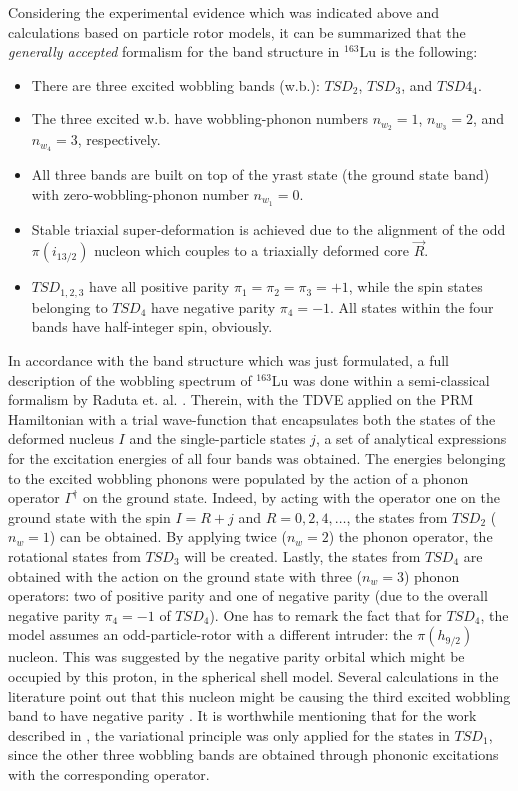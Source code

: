 \documentclass[11pt]{article}
\begin{document}
Considering the experimental evidence which was indicated above and calculations based on particle rotor models, it can be summarized that the \emph{generally accepted} formalism for the band structure in $^{163}$Lu is the following:
\begin{itemize}
    \item There are three excited wobbling bands (w.b.): $TSD_2$, $TSD_3$, and $TSD4_4$.
    \item The three excited w.b. have wobbling-phonon numbers $n_{w_2}=1$, $n_{w_3}=2$, and $n_{w_4}=3$, respectively.
    \item All three bands are built on top of the yrast state (the ground state band) with zero-wobbling-phonon number $n_{w_1}=0$.
    \item Stable triaxial super-deformation is achieved due to the alignment of the odd $\pi(i_{13/2})$ nucleon which couples to a triaxially deformed core $\vec{R}$.
    \item $TSD_{1,2,3}$ have all positive parity $\pi_1=\pi_2=\pi_3=+1$, while the spin states belonging to $TSD_4$ have negative parity $\pi_4=-1$. All states within the four bands have half-integer spin, obviously.
 \end{itemize}

In accordance with the band structure which was just formulated, a full description of the wobbling spectrum of $^{163}$Lu was done within a semi-classical formalism by Raduta et. al. \cite{raduta2017semiclassical}. Therein, with the TDVE applied on the PRM Hamiltonian with a trial wave-function that encapsulates both the states of the deformed nucleus $I$ and the single-particle states $j$, a set of analytical expressions for the excitation energies of all four bands was obtained. The energies belonging to the excited wobbling phonons were populated by the action of a phonon operator $\Gamma^\dagger$ on the ground state. Indeed, by acting with the operator one on the ground state with the spin $I=R+j$ and $R=0,2,4,\dots$, the states from $TSD_2$ ($n_w=1$) can be obtained. By applying twice ($n_w=2$) the phonon operator, the rotational states from $TSD_3$ will be created. Lastly, the states from $TSD_4$ are obtained with the action on the ground state with three ($n_w=3$) phonon operators: two of positive parity and one of negative parity (due to the overall negative parity $\pi_4=-1$ of $TSD_4$). One has to remark the fact that for $TSD_4$, the model assumes an odd-particle-rotor with a different intruder: the $\pi(h_{9/2})$ nucleon. This was suggested by the negative parity orbital which might be occupied by this proton, in the spherical shell model. Several calculations in the literature point out that this nucleon might be causing the third excited wobbling band to have negative parity \cite{jensen2004coexisting}. It is worthwhile mentioning that for the work described in \cite{raduta2017semiclassical}, the variational principle was only applied for the states in $TSD_1$, since the other three wobbling bands are obtained through phononic excitations with the corresponding operator.
\end{document}
